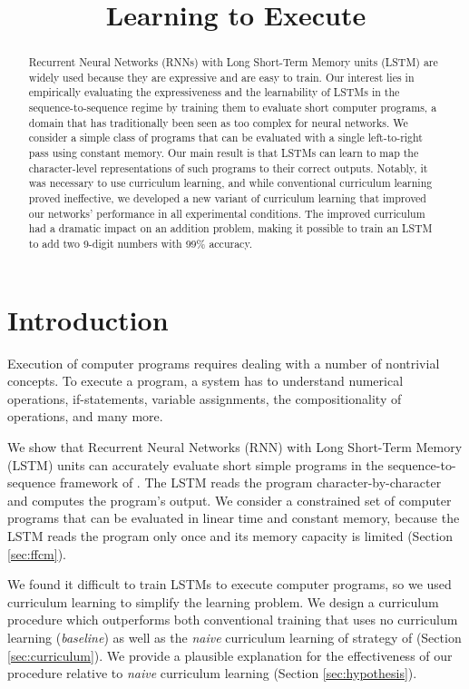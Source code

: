 \title{Learning to Execute}

\begin{abstract}
Recurrent Neural Networks (RNNs) with Long Short-Term Memory units (LSTM) are widely used because they are expressive and are easy to train.   Our interest lies in empirically evaluating the expressiveness and the learnability of LSTMs in the sequence-to-sequence regime by training them to evaluate short computer programs, a domain that has traditionally been seen as too complex for neural networks. We consider a simple class of programs that can be evaluated with a single left-to-right pass using constant memory. Our main result is that LSTMs can learn to map the character-level representations of such programs to their correct outputs. Notably, it was necessary to use curriculum learning,  and while conventional curriculum learning proved ineffective, we developed a new variant of curriculum learning that improved our networks' performance in all experimental conditions. The improved curriculum had a dramatic impact on an addition problem, making it possible to train an LSTM to add two 9-digit numbers with 99\% accuracy.
\end{abstract}

\section{Introduction}

Execution of computer programs requires dealing with a number of nontrivial concepts.  To execute a program, a system has to understand numerical operations, if-statements, variable assignments, the compositionality of operations, and many more.

We show that Recurrent Neural Networks (RNN) with Long Short-Term Memory (LSTM) units can accurately evaluate short simple programs in the sequence-to-sequence framework of \cite{sutskever2014sequence}. The LSTM reads the program character-by-character and computes the program's output. We consider a constrained set of computer programs that can be evaluated in linear time and constant memory, because the LSTM reads the program only once and its memory capacity is limited (Section \ref{sec:ffcm}). 

We found it difficult to train LSTMs to execute computer programs, so we used curriculum learning to simplify the learning problem. We design a curriculum procedure which outperforms both conventional training that uses no curriculum learning (\textit{baseline}) as well as the \textit{naive} curriculum learning of strategy of \cite{bengio2009curriculum} (Section \ref{sec:curriculum}).
We provide a plausible explanation for the effectiveness of our procedure relative to \textit{naive} curriculum learning (Section \ref{sec:hypothesis}).


